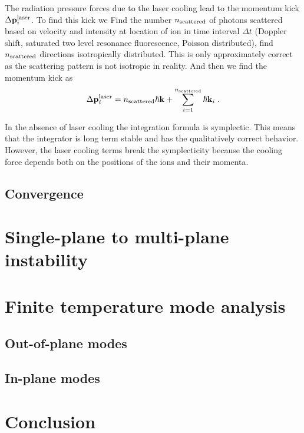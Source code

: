 \documentclass[aps, pra, preprint]{revtex4-1}
\begin{document}
The radiation pressure forces due to the laser cooling lead to
the momentum kick $\Delta \mathbf{p}_i^{\rm laser}$. To find this
kick we Find the number $n_{\rm scattered}$ of photons scattered
based on velocity and intensity at location of ion in time
interval $\Delta t$ (Doppler shift, saturated two level resonance
fluorescence, Poisson distributed), find $n_{\rm scattered}$ directions isotropically
distributed. This is only approximately correct as the scattering
pattern is not isotropic in reality. And then we find the
momentum kick as
\begin{equation}
\Delta \mathbf{p}_i^{\rm laser} = n_{\rm scattered}\hbar
\mathbf{k} + \sum_{i=1}^{n_{\rm scattered}} \hbar \mathbf{k}_i\;.
\end{equation}

In the absence of laser cooling the integration formula is
symplectic. This means that the integrator is long term stable
and has the qualitatively correct behavior. However, the laser
cooling terms break the symplecticity because the cooling force
depends both on the positions of the ions and their momenta.


\subsection{Convergence}



\section{Single-plane to multi-plane instability}


\section{Finite temperature mode analysis}

\subsection{Out-of-plane modes}

\subsection{In-plane modes}



\section{Conclusion}


\end{document}
